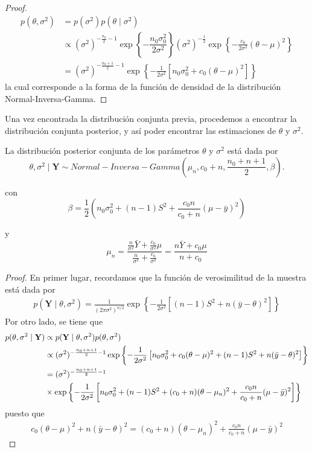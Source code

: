 \documentclass[10pt,openright]{book}\usepackage[]{graphicx}\usepackage[]{color}
\begin{document}
\begin{proof}
\begin{align*}
p(\theta,\sigma^2)&=p(\sigma^2)p(\theta \mid \sigma^2)\\
&\propto (\sigma^2)^{-\frac{n_0}{2}-1}\exp\left\{-\dfrac{n_0\sigma_0^2}{2\sigma^2}\right\}
(\sigma^2)^{-\frac{1}{2}}\exp\left\{-\frac{c_0}{2\sigma^2}(\theta-\mu)^2\right\}\\
&= (\sigma^2)^{-\frac{n_0+1}{2}-1}\exp\left\{-\frac{1}{2\sigma^2}\left[n_0\sigma^2_0+c_0(\theta-\mu)^2\right]\right\}
\end{align*}
la cual corresponde a la forma de la funci\'on de densidad de la distribuci\'on Normal-Inversa-Gamma.
\end{proof}

Una vez encontrada la distribuci\'on conjunta previa, procedemos a encontrar la distribuci\'on conjunta posterior, y as\'i poder encontrar las estimaciones de $\theta$ y $\sigma^2$.
\begin{Res}
La distribuci\'on posterior conjunta de los par\'ametros $\theta$ y $\sigma^2$ est\'a dada por
\begin{equation*}
\theta,\sigma^2\mid\mathbf{Y} \sim Normal-Inversa-Gamma\left(\mu_n, c_0+n, \frac{n_0+n+1}{2},\beta\right).
\end{equation*}

con 
\begin{equation*}
\beta=\dfrac{1}{2}\left(n_0\sigma^2_0+(n-1)S^2+\dfrac{c_0n}{c_0+n}(\mu-\bar{y})^2\right)
\end{equation*}

y
\begin{equation*}
\mu_n=\frac{\frac{n}{\sigma^2}\bar{Y}+\frac{c_0}{\sigma^2}\mu}{\frac{n}{\sigma^2}+\frac{c_0}{\sigma^2}}
=\frac{n\bar{Y}+c_0\mu}{n+c_0}
\end{equation*}
\end{Res}

\begin{proof}
En primer lugar, recordamos que la funci\'on de verosimilitud de la muestra est\'a dada por
\begin{align}
p(\mathbf{Y} \mid \theta,\sigma^2)= \frac{1}{(2\pi\sigma^2)^{n/2}}
\exp\left\{-\frac{1}{2\sigma^2}\left[(n-1)S^2+n(\bar{y}-\theta)^2\right]\right\}
\end{align}
Por otro lado, se tiene que
\begin{align}\label{desarro1}
p(\theta,\sigma^2 \mid \mathbf{Y}) & \propto p(\mathbf{Y} \mid \theta,\sigma^2)p(\theta,\sigma^2)\notag\\
&\propto (\sigma^2)^{-\frac{n_0+n+1}{2}-1}
\exp\left\{-\frac{1}{2\sigma^2}\left[n_0\sigma^2_0+c_0(\theta-\mu)^2+(n-1)S^2+n(\bar{y}-\theta)^2\right]\right\}\notag\\
&= (\sigma^2)^{-\frac{n_0+n+1}{2}-1}\\
&\times
\exp\left\{-\frac{1}{2\sigma^2}\left[n_0\sigma^2_0+(n-1)S^2+(c_0+n)(\theta-\mu_n)^2+\frac{c_0n}{c_0+n}(\mu-\bar{y})^2\right]\right\}
\end{align}
puesto que
\begin{align*}
c_0(\theta-\mu)^2+n(\bar{y}-\theta)^2=(c_0+n)(\theta-\mu_n)^2+\frac{c_0n}{c_0+n}(\mu-\bar{y})^2
\end{align*}
\end{proof}
\end{document}
